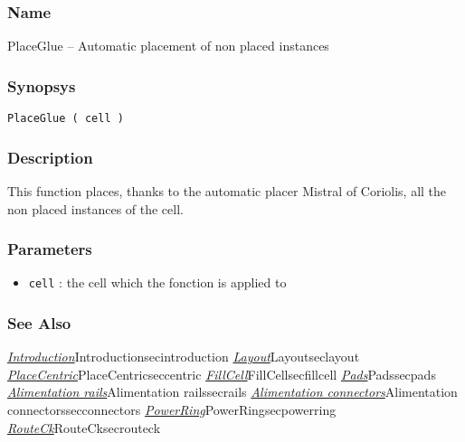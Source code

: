 \subsubsection{Name}

PlaceGlue -- Automatic placement of non placed instances

\subsubsection{Synopsys}

\begin{verbatim}
PlaceGlue ( cell )
\end{verbatim}

\subsubsection{Description}

This function places, thanks to the automatic placer Mistral of Coriolis, all the non placed instances of the cell.
    
\subsubsection{Parameters}

\begin{itemize}
    \item \verb-cell- : the cell which the fonction is applied to
\end{itemize}
    
%
%

\begin{htmlonly}

\subsubsection{See Also}

\hyperref[ref]{\emph{Introduction}}{}{Introduction}{secintroduction}
\hyperref[ref]{\emph{Layout}}{}{Layout}{seclayout}
\hyperref[ref]{\emph{PlaceCentric}}{}{PlaceCentric}{seccentric}
\hyperref[ref]{\emph{FillCell}}{}{FillCell}{secfillcell}
\hyperref[ref]{\emph{Pads}}{}{Pads}{secpads}
\hyperref[ref]{\emph{Alimentation rails}}{}{Alimentation rails}{secrails}
\hyperref[ref]{\emph{Alimentation connectors}}{}{Alimentation connectors}{secconnectors}
\hyperref[ref]{\emph{PowerRing}}{}{PowerRing}{secpowerring}
\hyperref[ref]{\emph{RouteCk}}{}{RouteCk}{secrouteck}

\end{htmlonly}
